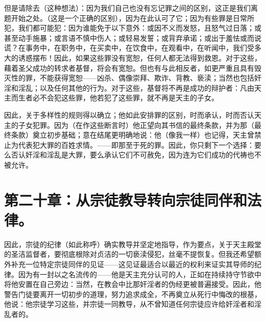 但是请除去（这种想法）：因为我们自己也没有忘记罪之间的区别，这正是我们离题开始之处。（这是一个正确的区别），因为在此认可了它；因为有些罪是日常所犯，我们都可能犯：因为谁能免于以下意外：或因不义而发怒，且怒气过日落；或甚至动手施暴；或言语不慎中伤人；或轻易发誓；或背弃承诺；或出于羞怯或而说谎？在事务中，在职务中，在买卖中，在饮食中，在观看中，在听闻中，我们受多大的诱惑摆布！因此，如果这些罪没有宽恕，任何人都无法得到救恩。对于这些，藉着圣父成功的转求者基督，将会有宽恕。但也有与此相反者，如更严重且具有毁灭性的罪，不能获得宽恕——凶杀、偶像崇拜、欺诈、背教、亵渎；当然也包括奸淫和淫乱；以及任何其他的行为。对于这些，基督将不再是成功的辩护者：凡由天主而生者必不会犯这些罪，他若犯了这些罪，就不再是天主的子女。\par

因此，关于多样性的规则得以确立；他如此安排罪的区别，时而承认，时而否认天主的子女犯罪。因为（在作这些断言时）他正望向其书信的最终条款，并为那（最终条款）奠立初步基础；意在结尾更明确地说：他（像我一样）也记得，天主曾禁止为代表犯大罪的百姓求情。——即那至于死的罪。因此，你只剩下一个选择：要么否认奸淫和淫乱是大罪，要么承认它们不可赦免，因为连为它们成功的代祷也不被允许。\par


\section{第二十章：从宗徒教导转向宗徒同伴和法律。}

因此，宗徒的纪律（如此称呼）确实教导并坚定地指导，作为要点，关于天主殿堂的圣洁监督者，要彻底根除对贞洁的一切亵渎侵犯，丝毫不提恢复。但我还希望额外补充一位特定宗徒同伴的见证——这见证最适合以最近的权利来证实其导师的纪律。因为有一封以之名流传的——他是天主充分认可的人，正如在持续持守节欲中将他安置在自己旁边：当然，在教会中比那奸淫者的伪经更被普遍接受。因此，他警告门徒要离开一切初步的道理，努力追求成全，不再奠立从死行中悔改的根基，他说：他宗徒学习这些，并宗徒一同教导，从不曾知道任何宗徒应许给奸淫者和淫乱者的。\par

